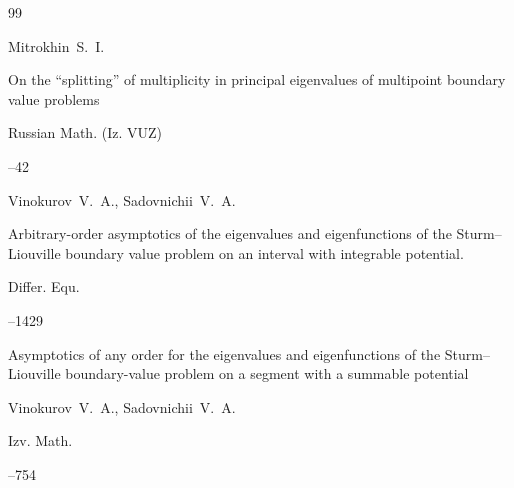 \begin{thebibliography}{99}




\by Mitrokhin~S.~I.

\paper On the ``splitting'' of multiplicity in principal eigenvalues of multipoint boundary value problems



\jour Russian Math. (Iz. VUZ)




--42






\by Vinokurov~V.~A., Sadovnichii~V.~A.

\paper Arbitrary-order asymptotics of the eigenvalues and eigenfunctions of the Sturm--Liouville boundary value problem on an interval with integrable potential.


\jour Differ. Equ.




--1429






\paper Asymptotics of any order for the eigenvalues and eigenfunctions of the Sturm--Liouville boundary-value problem on a segment with a summable potential

\by Vinokurov~V.~A., Sadovnichii~V.~A.

\jour Izv. Math.




--754




\end{thebibliography}
